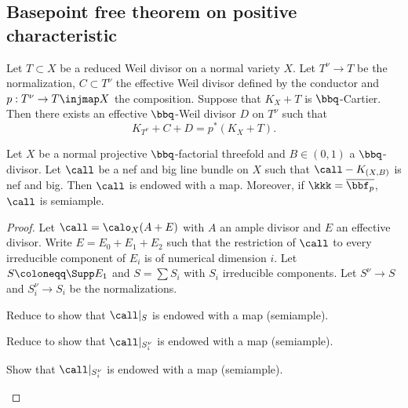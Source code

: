 \subsection{Basepoint free theorem on positive characteristic}

    \begin{proposition}\label{prop:adjunction_bpf_char_p}
        Let \(T \subset X\) be a reduced Weil divisor on a normal variety \(X\).
        Let \(T^\nu \to T\) be the normalization, \(C\subset T^\nu\) the effective Weil divisor defined by the conductor and \(p:T^\nu \to T \injmap X\) the composition.
        Suppose that \(K_X + T\) is \(\bbq\)-Cartier.
        Then there exists an effective \(\bbq\)-Weil divisor \(D\) on \(T^\nu\) such that 
        \[ K_{T^\nu} + C + D = p^*(K_X + T). \]
    \end{proposition}

    \begin{theorem}\label{thm:basepoint_free_nef_big_char_p}
        Let $X$ be a normal projective \(\bbq\)-factorial threefold and \(B \in (0,1)\) a \(\bbq\)-divisor.
        Let \(\call\) be a nef and big line bundle on \(X\) such that \(\call - K_{(X,B)}\) is nef and big.
        Then \(\call\) is endowed with a map.
        Moreover, if \(\kkk = \overline{\bbf_p}\), \(\call\) is semiample.
    \end{theorem}
    \begin{proof}
        Let \(\call=\calo_X(A+E)\) with \(A\) an ample divisor and \(E\) an effective divisor.
        Write \(E = E_0 + E_1 + E_2\) such that the restriction of \(\call\) to every irreducible component of \(E_i\) is of numerical dimension \(i\).
        Let \(S \coloneqq \Supp E_1\) and \(S = \sum S_i\) with \(S_i\) irreducible components.
        Let \(S^\nu \to S\) and \(S_i^\nu \to S_i\) be the normalizations.
       
        \begin{step}
            Reduce to show that \(\call|_{S}\) is endowed with a map (semiample).
        \end{step}

        \begin{step}
            Reduce to show that \(\call|_{S_i^\nu}\) is endowed with a map (semiample).
        \end{step}

        \begin{step}
            Show that \(\call|_{S_i^\nu}\) is endowed with a map (semiample).
        \end{step}

    \end{proof}


    